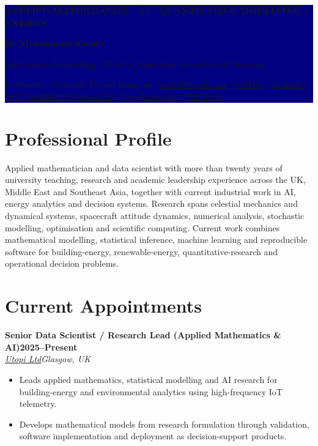 \documentclass[10pt,a4paper]{article}
\newcommand{\cvrole}[4]{\textbf{#1}\hfill\textbf{#2}\\[-1pt]\textit{#3}\hfill\textit{#4}\par}
\begin{document}
\noindent\colorbox{navy}{%
  \parbox{\dimexpr\linewidth-2\fboxsep\relax}{%
    \vspace{9pt}
    {\color{green}\bfseries\small APPLIED MATHEMATICS \;|\; AI \;|\; QUANTITATIVE MODELLING \;|\; ENERGY}\par
    \vspace{5pt}
    {\fontsize{24}{26}\selectfont\bfseries\color{white} Dr Muhammad Shoaib}\par
    \vspace{3pt}
    {\large\color{white} Mathematical modelling, AI and optimisation for real-world decisions}\par
    \vspace{6pt}
    {\small\color{white}
      Motherwell, Scotland, United Kingdom \quad | \quad
      \href{mailto:safridi@gmail.com}{safridi@gmail.com} \quad | \quad
      \href{https://github.com/drmshoaib}{GitHub} \quad | \quad
      \href{https://www.linkedin.com/in/drmshoaib}{LinkedIn}\\
      \href{https://orcid.org/0000-0003-1644-1559}{ORCID 0000-0003-1644-1559} \quad | \quad
      \href{https://scholar.google.com/citations?user=VCSUWUEAAAAJ}{Google Scholar} \quad | \quad
      \href{https://www.ssstechs.com/}{SSS Techs}
    }
    \vspace{9pt}
  }
}

\section{Professional Profile}
Applied mathematician and data scientist with more than twenty years of university teaching, research and academic leadership experience across the UK, Middle East and Southeast Asia, together with current industrial work in AI, energy analytics and decision systems. Research spans celestial mechanics and dynamical systems, spacecraft attitude dynamics, numerical analysis, stochastic modelling, optimisation and scientific computing. Current work combines mathematical modelling, statistical inference, machine learning and reproducible software for building-energy, renewable-energy, quantitative-research and operational decision problems.

\section{Current Appointments}
\cvrole{Senior Data Scientist / Research Lead (Applied Mathematics \& AI)}{2025--Present}{\href{https://www.utopi.co.uk/}{Utopi Ltd}}{Glasgow, UK}
\begin{itemize}
\item Leads applied mathematics, statistical modelling and AI research for building-energy and environmental analytics using high-frequency IoT telemetry.
\item Develops mathematical models from research formulation through validation, software implementation and deployment as decision-support products.
\end{itemize}
\end{document}
